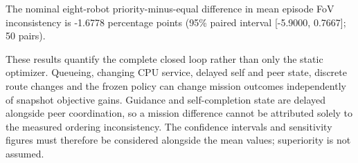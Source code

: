 The nominal eight-robot priority-minus-equal difference in mean episode FoV inconsistency is -1.6778 percentage points (95\% paired interval [-5.9000, 0.7667]; 50 pairs).

These results quantify the complete closed loop rather than only the static optimizer. Queueing, changing CPU service, delayed self and peer state, discrete route changes and the frozen policy can change mission outcomes independently of snapshot objective gains. Guidance and self-completion state are delayed alongside peer coordination, so a mission difference cannot be attributed solely to the measured ordering inconsistency. The confidence intervals and sensitivity figures must therefore be considered alongside the mean values; superiority is not assumed.
